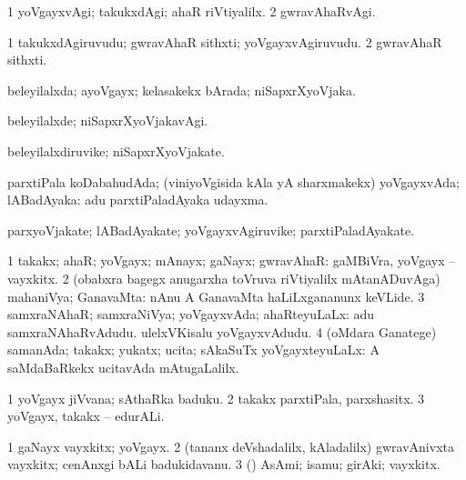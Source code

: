 \begin{center}
\bentry
{} 
\gl{\kirxvi}
\expl{}
\bmng
\bnum
\num{1} yoVgayxvAgi; takukxdAgi; ahaR riVtiyalilx. 
\num{2} gwravAhaRvAgi. 
\enum
\emng
\eentry

\bentry
{} 
\gl{\nA}
\expl{}
\bmng
\bnum
\num{1} takukxdAgiruvudu; gwravAhaR sithxti; yoVgayxvAgiruvudu. 
\num{2} gwravAhaR sithxti. 
\enum
\emng
\eentry

\bentry
{} 
\gl{\gu}
\expl{}
\bmng
beleyilalxda; ayoVgayx; kelasakekx bArada; niSapxrXyoVjaka. 
\emng
\eentry

\bentry
{} 
\gl{\kirxvi}
\expl{}
\bmng
beleyilalxde; niSapxrXyoVjakavAgi. 
\emng
\eentry

\bentry
{} 
\gl{\nA}
\expl{}
\bmng
beleyilalxdiruvike; niSapxrXyoVjakate. 
\emng
\eentry

\bentry
{} 
\gl{\gu}
\expl{}
\bmng
parxtiPala koDabahudAda; (viniyoVgisida kAla yA sharxmakekx) yoVgayxvAda; lABadAyaka:  adu parxtiPaladAyaka udayxma. 
\emng
\eentry

\bentry
{} 
\gl{\nA}
\expl{}
\bmng
parxyoVjakate; lABadAyakate; yoVgayxvAgiruvike; parxtiPaladAyakate. 
\emng
\eentry

\bentry
{} 
\gl{\gu}
\bmng
\bnum
\num{1} takakx; ahaR; yoVgayx; mAnayx; gaNayx; gwravAhaR:  gaMBiVra, yoVgayx -- vayxkitx. 
\num{2} (obabxra bagegx anugarxha toVruva riVtiyalilx mAtanADuvAga) mahaniVya; GanavaMta:  nAnu A GanavaMta haLiLxgananunx keVLide. 
\num{3} samxraNAhaR; samxraNiVya; yoVgayxvAda; ahaRteyuLaLx:  adu samxraNAhaRvAdudu.  ulelxVKisalu yoVgayxvAdudu. 
\num{4} (oMdara Ganatege) samanAda; takakx; yukatx; ucita; sAkaSuTx yoVgayxteyuLaLx:  A saMdaBaRkekx ucitavAda mAtugaLalilx. 
\enum
\emng

\noindent
\gl{\pagu}
\expl{}
\bmng
\bnum
\num{1}  yoVgayx jiVvana; sAthaRka baduku. 
\num{2}  takakx parxtiPala, parxshasitx. 
\num{3}  yoVgayx, takakx -- edurALi. 
\enum
\emng
\eentry

\bentry
{} 
\gl{\nA}
\bmng
\bnum
\num{1} gaNayx vayxkitx; yoVgayx. 
\num{2} (tananx deVshadalilx, kAladalilx) gwravAnivxta vayxkitx; cenAnxgi bALi badukidavanu. 
\num{3} (\hA) AsAmi; isamu; girAki; vayxkitx. 
\enum
\emng
\eentry


\end{center}
